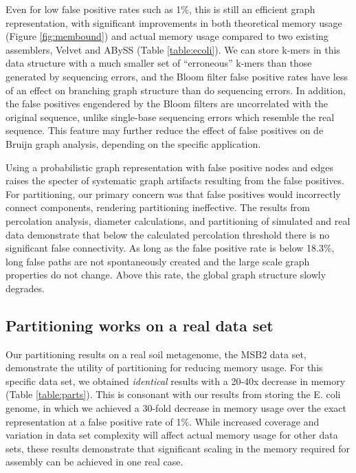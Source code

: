 \documentclass{pnastwo}
\begin{document}
\begin{article}
Even for low false positive rates such as 1\%, this is still an
efficient graph representation, with significant improvements in both
theoretical memory usage (Figure \ref{fig:membound}) and actual memory 
usage compared
to two existing assemblers, Velvet and ABySS (Table
\ref{table:ecoli}).  We can store k-mers in this data structure with a
much smaller set of ``erroneous'' k-mers than those generated by
sequencing errors, and the Bloom filter false positive rates have less
of an effect on branching graph structure than do sequencing errors.
In addition, the false positives engendered by the Bloom filters are
uncorrelated with the original sequence, unlike single-base sequencing
errors which resemble the real sequence.  This feature may further
reduce the effect of false positives on de Bruijn graph analysis,
depending on the specific application.

Using a probabilistic graph representation with false positive nodes
and edges raises the specter of systematic graph artifacts resulting
from the false positives.  For partitioning, our primary concern was
that false positives would incorrectly connect components, rendering
partitioning ineffective.  The results from percolation analysis,
diameter calculations, and partitioning of simulated and real data
demonstrate that below the calculated percolation threshold there is
no significant false connectivity.  As long as the false positive rate
is below 18.3\%, long false paths are not spontaneously created and
the large scale graph properties do not change.  Above this rate, the
global graph structure slowly degrades.

\subsection{Partitioning works on a real data set}

Our partitioning results on a real soil metagenome, the MSB2 data set,
demonstrate the utility of partitioning for reducing memory usage.
For this specific data set, we obtained {\em identical} results with a
20-40x decrease in memory (Table \ref{table:parts}).  This is
consonant with our results from storing the E. coli genome, in which
we achieved a 30-fold decrease in memory usage over the exact
representation at a false positive rate of 1\%.  While increased
coverage and variation in data set complexity will affect actual
memory usage for other data sets, these results demonstrate that
significant scaling in the memory required for assembly can be
achieved in one real case.


\end{article}
\end{document}
